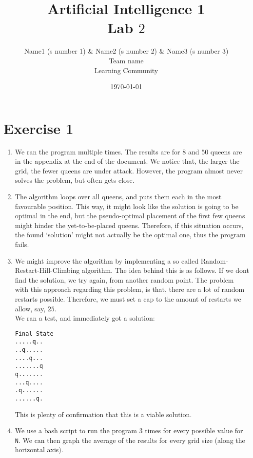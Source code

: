 \documentclass{article}
\title{{\bf Artificial Intelligence 1} \\ Lab $2$}%
\author{
Name1 (s number 1) \& Name2 (s number 2) \& Name3 (s number 3) \\ 
Team name \\
Learning Community
} %
\date{\today}%
\begin{document}
\maketitle

\section*{Exercise 1}
\begin{enumerate}[1.]
\item We ran the program multiple times. The results are for $8$ and $50$ queens are in the appendix at the end of the document. We notice that, the larger the grid, the fewer queens are under attack. However, the program almost never solves the problem, but often gets close. 
\item The algorithm loops over all queens, and puts them each in the most favourable position. This way, it might look like the solution is going to be optimal in the end, but the pseudo-optimal placement of the first few queens might hinder the yet-to-be-placed queens. Therefore, if this situation occurs, the found `solution' might not actually be the optimal one, thus the program fails.
\item We might improve the algorithm by implementing a so called Random-Restart-Hill-Climbing algorithm. The idea behind this is as follows. If we dont find the solution, we try again, from another random point. The problem with this approach regarding this problem, is that, there are a lot of random restarts possible. Therefore, we must set a cap to the amount of restarts we allow, say, $25$.\\
We ran a test, and immediately got a solution:
\begin{verbatim}
Final State
.....q..
..q.....
....q...
.......q
q.......
...q....
.q......
......q.
\end{verbatim}
This is plenty of confirmation that this is a viable solution.
\item We use a bash script to run the program 3 times for every possible value for \verb|N|. We can then graph the average of the results for every grid size (along the horizontal axis).\\

\usetikzlibrary{calc}
\end{enumerate}
\end{document}
